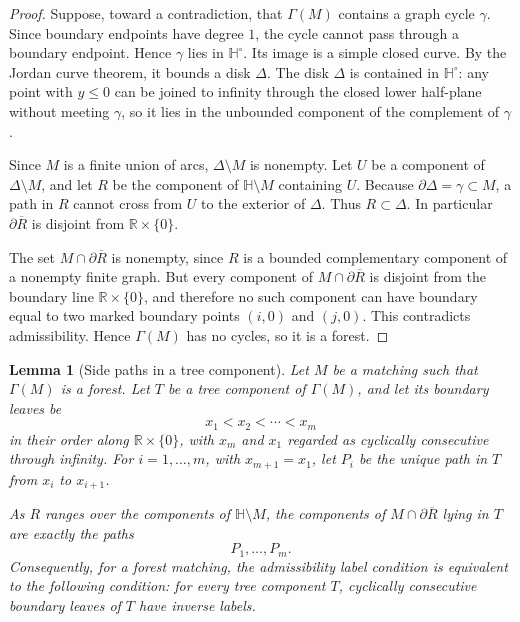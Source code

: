 \documentclass[12pt]{article}
\newcommand{\RR}{\mathbb{R}}
\newcommand{\HH}{\mathbb{H}}
\newcommand{\bd}{\partial}
\newtheorem{lemma}[theorem]{Lemma}
\theoremstyle{definition}
\begin{document}
\begin{proof}
Suppose, toward a contradiction, that \(\Gamma(M)\) contains a graph cycle \(\gamma\).  Since boundary endpoints have degree \(1\), the cycle cannot pass through a boundary endpoint.  Hence \(\gamma\) lies in \(\HH^\circ\).  Its image is a simple closed curve.  By the Jordan curve theorem, it bounds a disk \(\Delta\).  The disk \(\Delta\) is contained in \(\HH^\circ\): any point with \(y\leq 0\) can be joined to infinity through the closed lower half-plane without meeting \(\gamma\), so it lies in the unbounded component of the complement of \(\gamma\).

Since \(M\) is a finite union of arcs, \(\Delta\setminus M\) is nonempty.  Let \(U\) be a component of \(\Delta\setminus M\), and let \(R\) be the component of \(\HH\setminus M\) containing \(U\).  Because \(\bd\Delta=\gamma\subset M\), a path in \(R\) cannot cross from \(U\) to the exterior of \(\Delta\).  Thus \(R\subset\Delta\).  In particular \(\bd\overline R\) is disjoint from \(\RR\times\{0\}\).

The set \(M\cap\bd\overline R\) is nonempty, since \(R\) is a bounded complementary component of a nonempty finite graph.  But every component of \(M\cap\bd\overline R\) is disjoint from the boundary line \(\RR\times\{0\}\), and therefore no such component can have boundary equal to two marked boundary points \((i,0)\) and \((j,0)\).  This contradicts admissibility.  Hence \(\Gamma(M)\) has no cycles, so it is a forest.
\end{proof}

\begin{lemma}[Side paths in a tree component]\label{lem:sidepaths}
Let \(M\) be a matching such that \(\Gamma(M)\) is a forest.  Let \(T\) be a tree component of \(\Gamma(M)\), and let its boundary leaves be
\[
x_1<x_2<\cdots <x_m
\]
in their order along \(\RR\times\{0\}\), with \(x_m\) and \(x_1\) regarded as cyclically consecutive through infinity.  For \(i=1,\dots,m\), with \(x_{m+1}=x_1\), let \(P_i\) be the unique path in \(T\) from \(x_i\) to \(x_{i+1}\).

As \(R\) ranges over the components of \(\HH\setminus M\), the components of \(M\cap\bd\overline R\) lying in \(T\) are exactly the paths
\[
P_1,\dots,P_m.
\]
Consequently, for a forest matching, the admissibility label condition is equivalent to the following condition: for every tree component \(T\), cyclically consecutive boundary leaves of \(T\) have inverse labels.
\end{lemma}
\end{document}
